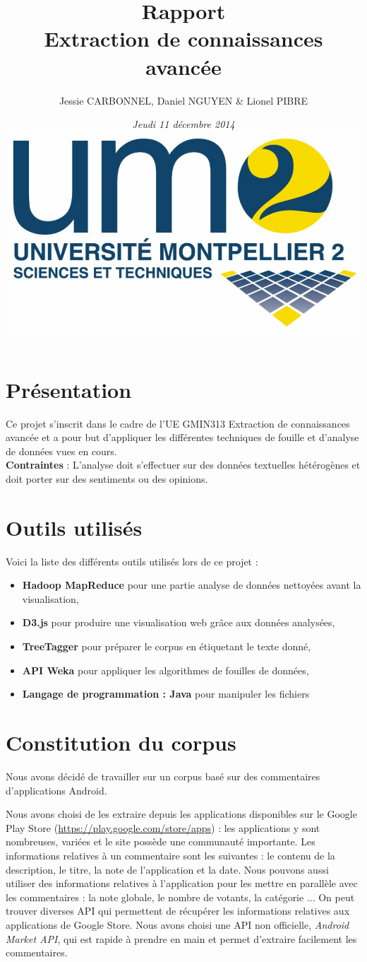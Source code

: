 \documentclass[a4paper, 11pt]{article}
\title{\textbf{Rapport}\\\Large{Extraction de connaissances avancée}}
\author{Jessie CARBONNEL, Daniel NGUYEN \& Lionel PIBRE}
\date{\textit{Jeudi 11 décembre 2014} \\ \includegraphics[height=.13\textheight]{um2.jpg}\\[1cm]}
\begin{document}
\maketitle

\section{Présentation}
Ce projet s'inscrit dans le cadre de l'UE GMIN313 Extraction de connaissances avancée et a pour but d'appliquer les différentes techniques de fouille et d'analyse de données vues en cours.\\

\textbf{Contraintes} : L'analyse doit s'effectuer sur des données textuelles hétérogènes et doit porter sur des sentiments ou des opinions.

\section{Outils utilisés}
Voici la liste des différents outils utilisés lors de ce projet : 
\begin{itemize}
\item \textbf{Hadoop MapReduce} pour une partie analyse de données nettoyées avant la visualisation,
\item \textbf{D3.js} pour produire une visualisation web grâce aux données analysées,
\item \textbf{TreeTagger} pour préparer le corpus en étiquetant le texte donné,
\item \textbf{API Weka} pour appliquer les algorithmes de fouilles de données,
\item \textbf{Langage de programmation : Java} pour manipuler les fichiers
\end{itemize}

\section{Constitution du corpus}

Nous avons décidé de travailler sur un corpus basé sur des commentaires d'applications Android.

Nous avons choisi de les extraire depuis les applications disponibles sur le Google Play Store (\url{https://play.google.com/store/apps}) : les applications y sont nombreuses, variées et le site possède une communauté importante.
Les informations relatives à un commentaire sont les suivantes : le contenu de la description, le titre, la note de l'application et la date. Nous pouvons aussi utiliser des informations relatives à l'application pour les mettre en parallèle avec les commentaires : la note globale, le nombre de votants, la catégorie ...
On peut trouver diverses API qui permettent de récupérer les informations relatives aux applications de Google Store. Nous avons choisi une API non officielle, \textit{Android Market API}, qui est rapide à prendre en main et permet d'extraire facilement les commentaires.
\end{document}
